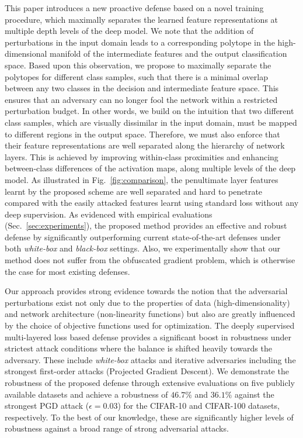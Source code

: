 \documentclass[10pt,twocolumn,letterpaper]{article}
\begin{document}
This paper introduces a new proactive defense based on a novel training procedure, which maximally separates the learned feature representations at multiple depth levels of the deep model. We note that the addition of perturbations in the input domain leads to a corresponding polytope in the high-dimensional manifold of the intermediate features and the output classification space. Based upon this observation, we propose to maximally separate the polytopes for different class samples, such that there is a minimal overlap between any two classes in the decision and intermediate feature space. This ensures that an adversary can no longer fool the network within a restricted perturbation budget. In other words, we build on the intuition that two different class samples, which are visually dissimilar in the input domain, must be mapped to different regions in the output space. Therefore, we must also enforce that their feature representations are well separated along the hierarchy of network layers. This is achieved by improving within-class proximities and enhancing between-class differences of the activation maps, along multiple levels of the deep model. As illustrated in Fig.~\ref{fig:comparison}, the penultimate layer features learnt by the proposed scheme are well separated and hard to penetrate compared with the easily attacked features learnt using standard loss without any deep supervision. As evidenced with empirical evaluations (Sec.~\ref{sec:experiments}), the proposed method provides an effective and robust defense by significantly outperforming current state-of-the-art defenses under both \textit{white-box} and \textit{black-box} settings. Also, we experimentally show that our method does not suffer from the obfuscated gradient problem, which is otherwise the case for most existing defenses.





Our approach provides strong evidence towards the notion that the adversarial perturbations exist not only due to the properties of data (\eg high-dimensionality) and network architecture (\eg non-linearity functions) but also are greatly influenced by the choice of objective functions used for optimization. The deeply supervised multi-layered loss based defense provides a significant boost in robustness under strictest attack conditions where the balance is shifted heavily towards the adversary. These include \emph{white-box} attacks and iterative adversaries including the strongest first-order attacks (Projected Gradient Descent). We demonstrate the robustness of the proposed defense through extensive evaluations on five publicly available datasets and achieve a robustness of $46.7\%$ and $36.1\%$ against the strongest PGD attack ($\epsilon = 0.03$) for the CIFAR-10 and CIFAR-100 datasets, respectively. To the best of our knowledge, these are significantly higher levels of robustness against a broad range of strong adversarial attacks.
\end{document}
